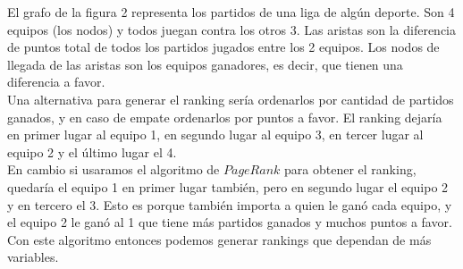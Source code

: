 El grafo de la figura 2 representa los partidos de una liga de algún deporte. Son 4 equipos (los nodos) y todos juegan contra los otros 3. Las aristas son la diferencia de puntos total de todos los partidos jugados entre los 2 equipos. Los nodos de llegada de las aristas son los equipos ganadores, es decir, que tienen una diferencia a favor.\\

Una alternativa para generar el ranking sería ordenarlos por cantidad de partidos ganados, y en caso de empate ordenarlos por puntos a favor. El ranking dejaría en primer lugar al equipo 1, en segundo lugar al equipo 3, en tercer lugar al equipo 2 y el último lugar el 4.\\

En cambio si usaramos el algoritmo de $PageRank$ para obtener el ranking, quedaría el equipo 1 en primer lugar también, pero en segundo lugar el equipo 2 y en tercero el 3. Esto es porque también importa a quien le ganó cada equipo, y el equipo 2 le ganó al 1 que tiene más partidos ganados y muchos puntos a favor. Con este algoritmo entonces podemos generar rankings que dependan de más variables.\\







